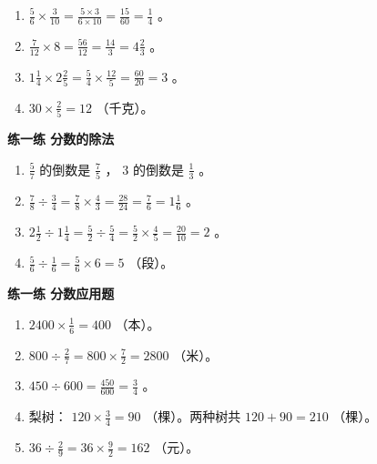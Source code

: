 \begin{answer}
\begin{enumerate}
  \item $\frac{5}{6} \times \frac{3}{10} = \frac{5 \times 3}{6 \times 10} = \frac{15}{60} = \frac{1}{4}$ 。
  \item $\frac{7}{12} \times 8 = \frac{56}{12} = \frac{14}{3} = 4\frac{2}{3}$ 。
  \item $1\frac{1}{4} \times 2\frac{2}{5} = \frac{5}{4} \times \frac{12}{5} = \frac{60}{20} = 3$ 。
  \item $30 \times \frac{2}{5} = 12$ （千克）。
\end{enumerate}


\textbf{练一练 分数的除法}

\begin{enumerate}
  \item $\frac{5}{7}$ 的倒数是 $\frac{7}{5}$ ， $3$ 的倒数是 $\frac{1}{3}$ 。
  \item $\frac{7}{8} \div \frac{3}{4} = \frac{7}{8} \times \frac{4}{3} = \frac{28}{24} = \frac{7}{6} = 1\frac{1}{6}$ 。
  \item $2\frac{1}{2} \div 1\frac{1}{4} = \frac{5}{2} \div \frac{5}{4} = \frac{5}{2} \times \frac{4}{5} = \frac{20}{10} = 2$ 。
  \item $\frac{5}{6} \div \frac{1}{6} = \frac{5}{6} \times 6 = 5$ （段）。
\end{enumerate}


\textbf{练一练 分数应用题}

\begin{enumerate}
  \item $2400 \times \frac{1}{6} = 400$ （本）。
  \item $800 \div \frac{2}{7} = 800 \times \frac{7}{2} = 2800$ （米）。
  \item $450 \div 600 = \frac{450}{600} = \frac{3}{4}$ 。
  \item 梨树： $120 \times \frac{3}{4} = 90$ （棵）。两种树共 $120 + 90 = 210$ （棵）。
  \item $36 \div \frac{2}{9} = 36 \times \frac{9}{2} = 162$ （元）。
\end{enumerate}


\end{answer}

